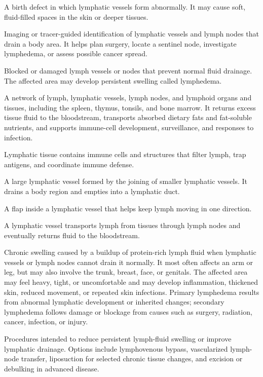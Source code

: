  A birth defect in which lymphatic vessels form abnormally. It may cause soft, fluid-filled spaces in the skin or deeper tissues.

 Imaging or tracer-guided identification of lymphatic vessels and lymph nodes that drain a body area. It helps plan surgery, locate a sentinel node, investigate lymphedema, or assess possible cancer spread.

 Blocked or damaged lymph vessels or nodes that prevent normal fluid drainage. The affected area may develop persistent swelling called lymphedema.

 A network of lymph, lymphatic vessels, lymph nodes, and lymphoid organs and tissues, including the spleen, thymus, tonsils, and bone marrow. It returns excess tissue fluid to the bloodstream, transports absorbed dietary fats and fat-soluble nutrients, and supports immune-cell development, surveillance, and responses to infection.

 Lymphatic tissue contains immune cells and structures that filter lymph, trap antigens, and coordinate immune defense.

 A large lymphatic vessel formed by the joining of smaller lymphatic vessels. It drains a body region and empties into a lymphatic duct.

 A flap inside a lymphatic vessel that helps keep lymph moving in one direction.

 A lymphatic vessel transports lymph from tissues through lymph nodes and eventually returns fluid to the bloodstream.

 Chronic swelling caused by a buildup of protein-rich lymph fluid when lymphatic vessels or lymph nodes cannot drain it normally. It most often affects an arm or leg, but may also involve the trunk, breast, face, or genitals. The affected area may feel heavy, tight, or uncomfortable and may develop inflammation, thickened skin, reduced movement, or repeated skin infections. Primary lymphedema results from abnormal lymphatic development or inherited changes; secondary lymphedema follows damage or blockage from causes such as surgery, radiation, cancer, infection, or injury.

 Procedures intended to reduce persistent lymph-fluid swelling or improve lymphatic drainage. Options include lymphovenous bypass, vascularized lymph-node transfer, liposuction for selected chronic tissue changes, and excision or debulking in advanced disease.

